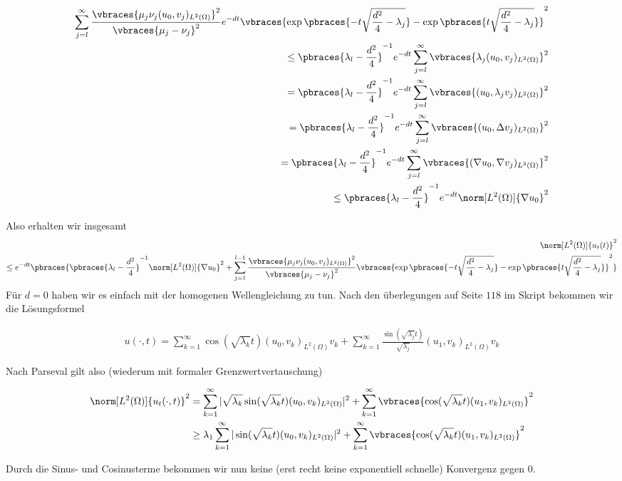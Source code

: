 \begin{solution}
\begin{enumerate}[label = (\roman*)]
\begin{align*}
		\sum_{j=l}^\infty \frac{\vbraces{\mu_j\nu_j(u_0, v_j)_{L^2(\Omega)}}^2}{\vbraces{\mu_j - \nu_j}^2} e^{-d t}\vbraces{\exp\pbraces{-t\sqrt{\frac{d^2}{4} - \lambda_j} } - \exp\pbraces{t\sqrt{\frac{d^2}{4} - \lambda_j} }}^2 \\
		\leq \pbraces{\lambda_l - \frac{d^2}{4}}^{-1} e^{-d t} \sum_{j=l}^\infty \vbraces{\lambda_j (u_0, v_j)_{L^2(\Omega)}}^2 \\
		= \pbraces{\lambda_l - \frac{d^2}{4}}^{-1} e^{-d t} \sum_{j=l}^\infty \vbraces{ (u_0, \lambda_j v_j)_{L^2(\Omega)}}^2 \\
		= \pbraces{\lambda_l - \frac{d^2}{4}}^{-1} e^{-d t} \sum_{j=l}^\infty \vbraces{ (u_0, \Delta v_j)_{L^2(\Omega)}}^2 \\
		= \pbraces{\lambda_l - \frac{d^2}{4}}^{-1} e^{-d t} \sum_{j=l}^\infty \vbraces{ (\nabla u_0, \nabla v_j)_{L^2(\Omega)}}^2 \\
		\leq \pbraces{\lambda_l - \frac{d^2}{4}}^{-1} e^{-d t} \norm[L^2(\Omega)]{\nabla u_0}^2
	\end{align*}

	Also erhalten wir insgesamt
	\begin{align*}
		\norm[L^2(\Omega)]{u_t(t)}^2 \\
		 \leq e^{- d t} \pbraces{ \pbraces{\lambda_l - \frac{d^2}{4}}^{-1} \norm[L^2(\Omega)]{\nabla u_0}^2 + \sum_{j=1}^{l-1} \frac{\vbraces{\mu_j\nu_j(u_0, v_j)_{L^2(\Omega)}}^2}{\vbraces{\mu_j - \nu_j}^2} \vbraces{\exp\pbraces{-t\sqrt{\frac{d^2}{4} - \lambda_j} } - \exp\pbraces{t\sqrt{\frac{d^2}{4} - \lambda_j} }}^2}
	\end{align*}
	Für $d = 0$ haben wir es einfach mit der homogenen Wellengleichung zu tun. Nach den überlegungen auf Seite $118$ im Skript bekommen wir die Lösungsformel

  \begin{align*}
    u(\cdot, t)
    =
    \sum_{k=1}^\infty \cos(\sqrt{\lambda_k}t) (u_0, v_k)_{L^2(\Omega)} v_k
    +
    \sum_{k=1}^\infty \frac{\sin(\sqrt{\lambda_j }t)}{\sqrt{\lambda_j}} (u_1, v_k)_{L^2(\Omega)} v_k
  \end{align*}

  Nach Parseval gilt also (wiederum mit formaler Grenzwertvertauschung)

  \begin{align*}
    \norm[L^2(\Omega)]{u_t(\cdot, t)}^2
    &=
    \sum_{k=1}^\infty | \sqrt{\lambda_k} \sin(\sqrt{\lambda_k}t) (u_0, v_k)_{L^2(\Omega)}|^2
    +
    \sum_{k=1}^\infty \vbraces{\cos(\sqrt{\lambda_k}t) (u_1, v_k)_{L^2(\Omega)}}^2 \\
    &\geq
    \lambda_1 \sum_{k=1}^\infty |\sin(\sqrt{\lambda_k}t) (u_0, v_k)_{L^2(\Omega)}|^2
    +
    \sum_{k=1}^\infty \vbraces{\cos(\sqrt{\lambda_k}t) (u_1, v_k)_{L^2(\Omega)}}^2
  \end{align*}

  Durch die Sinus- und Cosinusterme bekommen wir nun keine (erst recht keine exponentiell schnelle) Konvergenz gegen 0.
\end{enumerate}

\end{solution}

